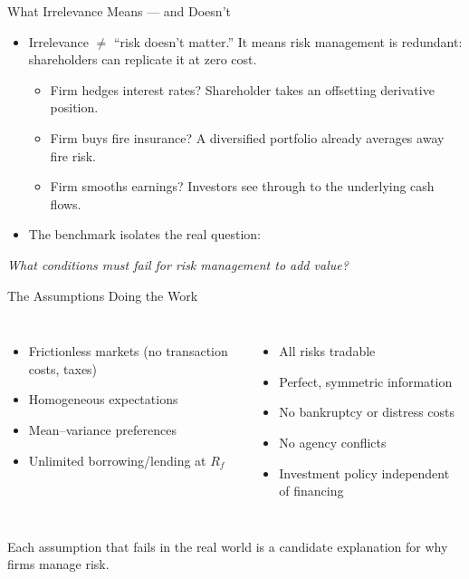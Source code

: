\documentclass[11pt, aspectratio=169]{beamer}
\begin{document}
\begin{frame}{What Irrelevance Means --- and Doesn't}
\begin{itemize}
  \item Irrelevance $\neq$ ``risk doesn't matter.'' It means risk management is \alert{redundant}: shareholders can replicate it at zero cost.
  \begin{itemize}
    \item Firm hedges interest rates? Shareholder takes an offsetting derivative position.
    \item Firm buys fire insurance? A diversified portfolio already averages away fire risk.
    \item Firm smooths earnings? Investors see through to the underlying cash flows.
  \end{itemize}
  \item The benchmark isolates the real question:
\end{itemize}
\medskip
\begin{center}
\large\emph{What conditions must fail for risk management to add value?}
\end{center}
\end{frame}

\begin{frame}{The Assumptions Doing the Work}
\begin{columns}[T]
\begin{itemize}
  \item Frictionless markets (no transaction costs, taxes)
  \item Homogeneous expectations
  \item Mean--variance preferences
  \item Unlimited borrowing/lending at $R_f$
\end{itemize}
\begin{itemize}
  \item All risks tradable
  \item Perfect, symmetric information
  \item No bankruptcy or distress costs
  \item No agency conflicts
  \item Investment policy independent of financing
\end{itemize}
\end{columns}
\medskip
Each assumption that fails in the real world is a candidate explanation for why firms manage risk.
\end{frame}
\end{document}
